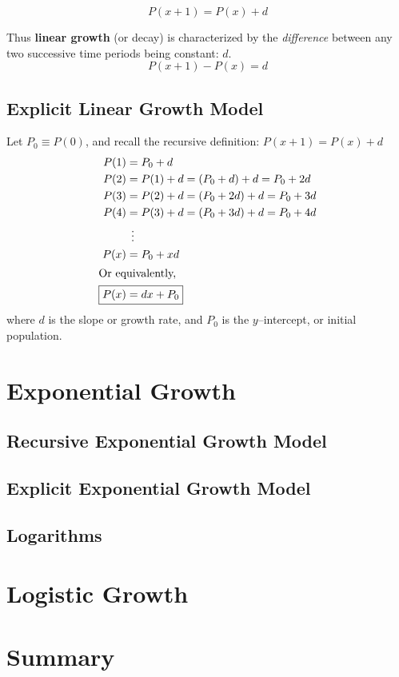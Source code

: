 \begin{equation}
  \boxed{P(x+1) = P(x) + d}\label{eq:recursive-linear-model}
\end{equation}

Thus \textbf{linear growth} (or decay) is characterized by the
\emph{difference} between any two successive time periods being
constant: \(d\).
\[
  P(x+1) - P(x) = d
\]

\subsection{Explicit Linear Growth Model}%
\label{sec:explicit-linear}

Let \(P_0\equiv P(0)\), and recall the recursive definition:
\(P(x+1) = P(x) + d \)
\begin{align*}
  P(1) &= P_0 + d \\
  P(2) &= P(1) + d = (P_0 + d) + d = P_0 + 2d \\
  P(3) &= P(2) + d = (P_0 + 2d) + d = P_0 + 3d \\
  P(4) &= P(3) + d = (P_0 + 3d) + d = P_0 + 4d \\
       & \: \: \vdots \\
  P(x) &= P_0 + xd\\
  \intertext{Or equivalently,}
  \Aboxed{P(x) &= dx + P_0}
\end{align*}
where \(d\) is the slope or growth rate, and \(P_0\) is the
\(y\)--intercept, or initial population.

\section{Exponential Growth}%
\label{sec:exponential-growth}

\subsection{Recursive Exponential Growth Model}%
\label{sec:recursive-exponential}


\subsection{Explicit Exponential Growth Model}%
\label{sec:explicit-exponential}

\subsection{Logarithms}%
\label{sec:logarithms}


\section{Logistic Growth}%
\label{sec:logistic-growth}

\section{Summary}%
\label{sec:growth-models-summary}






